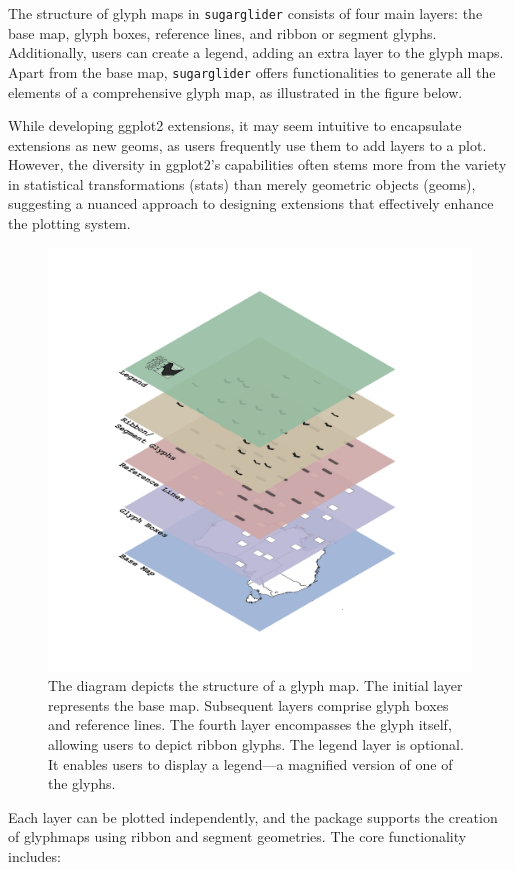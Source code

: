 The structure of glyph maps in \texttt{sugarglider} consists of four main layers: the base map, glyph boxes, reference lines, and ribbon or segment glyphs. Additionally, users can create a legend, adding an extra layer to the glyph maps. Apart from the base map, \texttt{sugarglider} offers functionalities to generate all the elements of a comprehensive glyph map, as illustrated in the figure below.

While developing ggplot2 extensions, it may seem intuitive to encapsulate extensions as new geoms, as users frequently use them to add layers to a plot. However, the diversity in ggplot2's capabilities often stems more from the variety in statistical transformations (stats) than merely geometric objects (geoms), suggesting a nuanced approach to designing extensions that effectively enhance the plotting system.

\begin{figure}

{\centering \includegraphics[width=0.6\linewidth]{figures/glyphmap-layers} 

}

\caption{The diagram depicts the structure of a glyph map. The initial layer represents the base map. Subsequent layers comprise glyph boxes and reference lines. The fourth layer encompasses the glyph itself, allowing users to depict ribbon glyphs. The legend layer is optional. It enables users to display a legend—a magnified version of one of the glyphs.}\label{fig:unnamed-chunk-1}
\end{figure}

Each layer can be plotted independently, and the package supports the creation of glyphmaps using ribbon and segment geometries. The core functionality includes:

